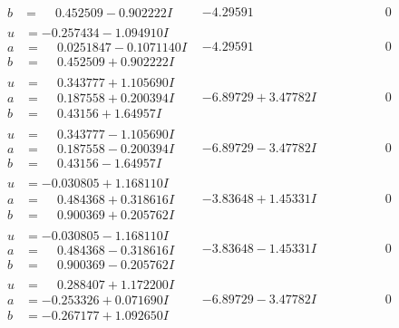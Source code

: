 \documentclass[1p]{elsarticle_modified}
\theoremstyle{definition}
\begin{document}
$$\begin{array}{c|c|c}
\begin{aligned}
b &= \phantom{-}0.452509 - 0.902222 I\end{aligned}
 & -4.29591\phantom{ +0.000000I} & \phantom{-0.000000 } 0 \\ \hline\begin{aligned}
u &= -0.257434 - 1.094910 I \\
a &= \phantom{-}0.0251847 - 0.1071140 I \\
b &= \phantom{-}0.452509 + 0.902222 I\end{aligned}
 & -4.29591\phantom{ +0.000000I} & \phantom{-0.000000 } 0 \\ \hline\begin{aligned}
u &= \phantom{-}0.343777 + 1.105690 I \\
a &= \phantom{-}0.187558 + 0.200394 I \\
b &= \phantom{-}0.43156 + 1.64957 I\end{aligned}
 & -6.89729 + 3.47782 I & \phantom{-0.000000 } 0 \\ \hline\begin{aligned}
u &= \phantom{-}0.343777 - 1.105690 I \\
a &= \phantom{-}0.187558 - 0.200394 I \\
b &= \phantom{-}0.43156 - 1.64957 I\end{aligned}
 & -6.89729 - 3.47782 I & \phantom{-0.000000 } 0 \\ \hline\begin{aligned}
u &= -0.030805 + 1.168110 I \\
a &= \phantom{-}0.484368 + 0.318616 I \\
b &= \phantom{-}0.900369 + 0.205762 I\end{aligned}
 & -3.83648 + 1.45331 I & \phantom{-0.000000 } 0 \\ \hline\begin{aligned}
u &= -0.030805 - 1.168110 I \\
a &= \phantom{-}0.484368 - 0.318616 I \\
b &= \phantom{-}0.900369 - 0.205762 I\end{aligned}
 & -3.83648 - 1.45331 I & \phantom{-0.000000 } 0 \\ \hline\begin{aligned}
u &= \phantom{-}0.288407 + 1.172200 I \\
a &= -0.253326 + 0.071690 I \\
b &= -0.267177 + 1.092650 I\end{aligned}
 & -6.89729 - 3.47782 I & \phantom{-0.000000 } 0 \\ \hline\begin{aligned}

\end{aligned}
\end{array}$$
\end{document}
